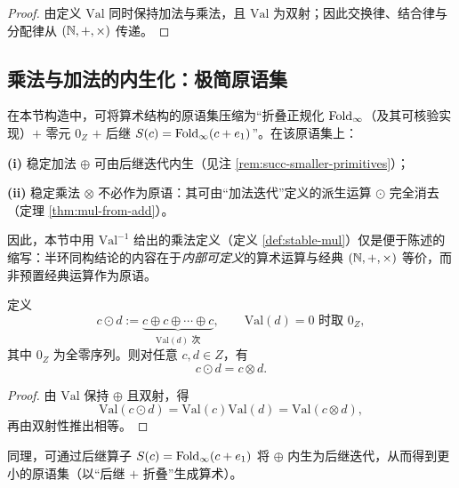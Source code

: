 \begin{proof}
由定义 $\mathrm{Val}$ 同时保持加法与乘法，且 $\mathrm{Val}$ 为双射；因此交换律、结合律与分配律从 $(\mathbb{N},+,\times)$ 传递。
\end{proof}

\subsection{乘法与加法的内生化：极简原语集}
\begin{proposition}\label{prop:definitional-economy-arith}
在本节构造中，可将算术结构的原语集压缩为“折叠正规化 $\mathrm{Fold}_\infty$（及其可核验实现）$+$ 零元 $0_Z$ $+$ 后继 $S(c)=\mathrm{Fold}_\infty(c+e_1)$”。在该原语集上：\par
\noindent\textbf{(i)} 稳定加法 $\oplus$ 可由后继迭代内生（见注 \ref{rem:succ-smaller-primitives}）；\par
\noindent\textbf{(ii)} 稳定乘法 $\otimes$ 不必作为原语：其可由“加法迭代”定义的派生运算 $\odot$ 完全消去（定理 \ref{thm:mul-from-add}）。\par
因此，本节中用 $\mathrm{Val}^{-1}$ 给出的乘法定义（定义 \ref{def:stable-mul}）仅是便于陈述的缩写：半环同构结论的内容在于\emph{内部可定义}的算术运算与经典 $(\mathbb{N},+,\times)$ 等价，而非预置经典运算作为原语。
\end{proposition}

\begin{theorem}[乘法可由加法与迭代内生]\label{thm:mul-from-add}
定义
$$
c\odot d := \underbrace{c\oplus c\oplus\cdots\oplus c}_{\mathrm{Val}(d)\text{ 次}},
\qquad
\mathrm{Val}(d)=0 \text{ 时取 } 0_Z,
$$
其中 $0_Z$ 为全零序列。则对任意 $c,d\in Z$，有
$$
c\odot d = c\otimes d.
$$
\end{theorem}

\begin{proof}
由 $\mathrm{Val}$ 保持 $\oplus$ 且双射，得
$$
\mathrm{Val}(c\odot d)=\mathrm{Val}(c)\mathrm{Val}(d)=\mathrm{Val}(c\otimes d),
$$
再由双射性推出相等。
\end{proof}

\begin{remark}[后继算子与更小原语集]\label{rem:succ-smaller-primitives}
同理，可通过后继算子 $S(c)=\mathrm{Fold}_\infty(c+e_1)$ 将 $\oplus$ 内生为后继迭代，从而得到更小的原语集（以“后继 $+$ 折叠”生成算术）。
\end{remark}

